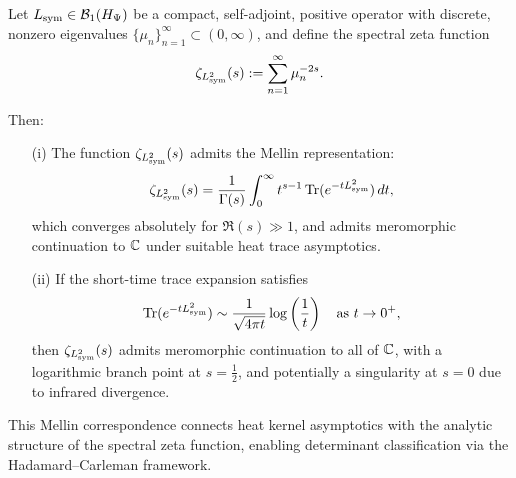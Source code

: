 \begin{lemma}
\label{lem:spectral_zeta_from_heat}
Let \( L_{\mathrm{sym}} \in \mathcal{B}_1(H_{\Psi}) \) be a compact, self-adjoint, positive operator with discrete, nonzero eigenvalues \( \{ \mu_n \}_{n=1}^\infty \subset (0, \infty) \), and define the spectral zeta function
\[
\zeta_{L_{\mathrm{sym}}^2}(s) := \sum_{n=1}^\infty \mu_n^{-2s}.
\]

Then:
\begin{enumerate}
    \item[\textnormal{(i)}] The function \( \zeta_{L_{\mathrm{sym}}^2}(s) \) admits the Mellin representation:
    \[
    \zeta_{L_{\mathrm{sym}}^2}(s)
    = \frac{1}{\Gamma(s)} \int_0^\infty t^{s-1} \operatorname{Tr}(e^{-t L_{\mathrm{sym}}^2}) \, dt,
    \]
    which converges absolutely for \( \Re(s) \gg 1 \), and admits meromorphic continuation to \( \mathbb{C} \) under suitable heat trace asymptotics.

    \item[\textnormal{(ii)}] If the short-time trace expansion satisfies
    \[
    \operatorname{Tr}(e^{-t L_{\mathrm{sym}}^2}) \sim \frac{1}{\sqrt{4\pi t}} \log\left( \frac{1}{t} \right)
    \quad \text{as } t \to 0^+,
    \]
    then \( \zeta_{L_{\mathrm{sym}}^2}(s) \) admits meromorphic continuation to all of \( \mathbb{C} \), with a logarithmic branch point at \( s = \tfrac{1}{2} \), and potentially a singularity at \( s = 0 \) due to infrared divergence.
\end{enumerate}

\medskip
\noindent
This Mellin correspondence connects heat kernel asymptotics with the analytic structure of the spectral zeta function, enabling determinant classification via the Hadamard--Carleman framework.
\end{lemma}
